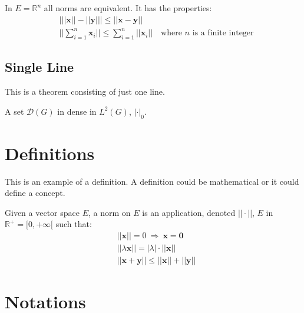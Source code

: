 \documentclass[11pt,fleqn,twoside]{book} %
\begin{document}
\begin{theorem}
    In $E=\mathbb{R}^n$ all norms are equivalent. It has the properties:
    \begin{align}
         & \big| ||\mathbf{x}|| - ||\mathbf{y}|| \big|\leq || \mathbf{x}- \mathbf{y}||                            \\
         & ||\sum_{i=1}^n\mathbf{x}_i||\leq \sum_{i=1}^n||\mathbf{x}_i||\quad\text{where $n$ is a finite integer}
    \end{align}
\end{theorem}

\subsection{Single Line}
This is a theorem consisting of just one line.

\begin{theorem}
    A set $\mathcal{D}(G)$ in dense in $L^2(G)$, $|\cdot|_0$.
\end{theorem}


\section{Definitions}

This is an example of a definition. A definition could be mathematical or it could define a concept.

\begin{definition}
    Given a vector space $E$, a norm on $E$ is an application, denoted $||\cdot||$, $E$ in $\mathbb{R}^+=[0,+\infty[$ such that:
    \begin{align}
         & ||\mathbf{x}||=0\ \Rightarrow\ \mathbf{x}=\mathbf{0}        \\
         & ||\lambda \mathbf{x}||=|\lambda|\cdot ||\mathbf{x}||        \\
         & ||\mathbf{x}+\mathbf{y}||\leq ||\mathbf{x}||+||\mathbf{y}||
    \end{align}
\end{definition}


\section{Notations}
\end{document}
